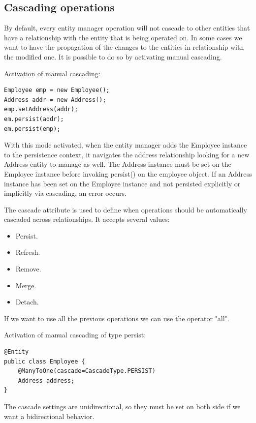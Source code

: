 \documentclass[12pt, a4paper]{report}
\begin{document}
    \subsection{Cascading operations}
    By default, every entity manager operation will not cascade to other entities that have a relationship with the entity that is being operated on. In some cases we want 
    to have the propagation of the changes to the entities in relationship with the modified one. It is possible to do so by activating manual cascading. 
    \begin{example}
        Activation of manual cascading: 
        \begin{lstlisting}[style=Java]
Employee emp = new Employee();
Address addr = new Address();
emp.setAddress(addr);
em.persist(addr);
em.persist(emp);
        \end{lstlisting}
        With this mode activated, when the entity manager adds the Employee instance to the persistence context, it navigates the address relationship looking for a 
        new Address entity to manage as well. The Address instance must be set on the Employee instance before invoking persist() on the employee object. If an Address 
        instance has been set on the Employee instance and not persisted explicitly or implicitly via cascading, an error occurs.
    \end{example}
    The cascade attribute is used to define when operations should be automatically cascaded across relationships. It accepts several values: 
    \begin{itemize}
        \item Persist. 
        \item Refresh. 
        \item Remove.
        \item Merge.
        \item Detach.
    \end{itemize}
    If we want to use all the previous operations we can use the operator "all". 
    \begin{example}
        Activation of manual cascading of type persist: 
        \begin{lstlisting}[style=Java]
@Entity
public class Employee {
    @ManyToOne(cascade=CascadeType.PERSIST)
    Address address;
}
        \end{lstlisting}
    \end{example}
    The cascade settings are unidirectional, so they must be set on both side if we want a bidirectional behavior. 
\end{document}
